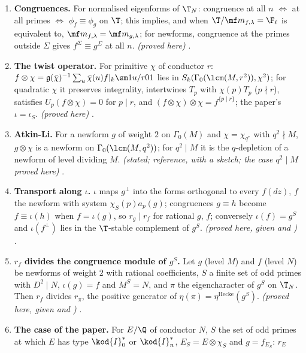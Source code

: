 \begin{enumerate}[label=\textbf{\thechapter.\arabic*}]
congruences. \emph{(proved here)} .
\item \textbf{Congruences.} For normalised eigenforms of $\T_N$: congruence at all $n$ $\iff$ at all primes $\iff$ $\phi_f\equiv\phi_g$ on $\T$; this implies, and when $\T/\mf m_{f,\lambda}=\F_\ell$ is
equivalent to, $\mf m_{f,\lambda}=\mf m_{g,\lambda}$; for newforms, congruence at the primes outside $\Sigma$ gives $f^\Sigma\equiv g^\Sigma$ at all $n$. \emph{(proved here)} .
\item \textbf{The twist operator.} For primitive $\chi$ of conductor $r$: $f\otimes\chi=\mathfrak g(\bar\chi)^{-1}\sum_u\bar\chi(u)f|_k\sm1{u/r}01$ lies in $S_k(\Gamma_0(\lcm(M,r^2)),\chi^2)$; for
quadratic $\chi$ it preserves integrality, intertwines $T_p$ with $\chi(p)T_p$ ($p\nmid r$), satisfies $U_p(f\otimes\chi)=0$ for $p\mid r$, and $(f\otimes\chi)\otimes\chi=f^{\{p\mid r\}}$; the
paper's $\iota=\iota_S$. \emph{(proved here)} .
\item \textbf{Atkin-Li.} For a newform $g$ of weight $2$ on $\Gamma_0(M)$ and $\chi=\chi_{q^*}$ with $q^2\nmid M$, $g\otimes\chi$ is a newform on $\Gamma_0(\lcm(M,q^2))$; for $q^2\mid M$ it
is the $q$-depletion of a newform of level dividing $M$. \emph{(stated; reference, with a sketch; the case $q^2\mid M$ proved here)} .
\item \textbf{Transport along $\iota$.} $\iota$ maps $g^\perp$ into the forms orthogonal to every $f(dz)$, $f$ the newform with system $\chi_S(p)a_p(g)$; congruences
$g\equiv h$ become $f\equiv\iota(h)$ when $f=\iota(g)$, so $r_g\mid r_f$ for rational $g$, $f$; conversely $\iota(f)=g^S$ and $\iota(f^\perp)$ lies in the $\T$-stable complement of $g^S$. \emph{(proved here, given
 and )} .
\item \textbf{$r_f$ divides the congruence module of $g^S$.} Let $g$ (level $M$) and $f$ (level $N$) be newforms of weight $2$ with rational coefficients, $S$ a finite set of odd primes with
$D^2\mid N$, $\iota(g)=f$ and $M^S=N$, and $\pi$ the eigencharacter of $g^S$ on $\T_N$. Then $r_f$ divides $r_\pi$, the positive generator of $\eta(\pi)=\eta^{\mathrm{Hecke}}(g^S)$.
\emph{(proved here, given  and )} .
\item \textbf{The case of the paper.} For $E/\Q$ of conductor $N$, $S$ the set of odd primes at which $E$ has type $\kod{I}_0^*$ or $\kod{I}_n^*$, $E_S=E\otimes\chi_S$ and $g=f_{E_S}$: $r_E$

\end{enumerate}
